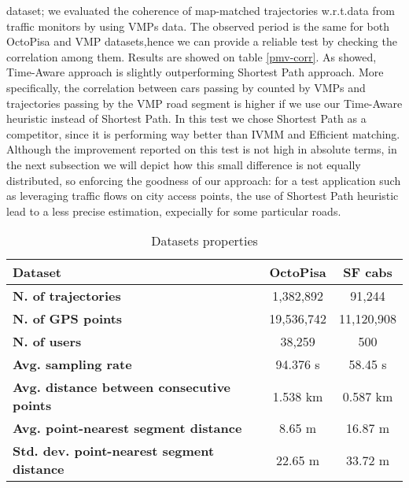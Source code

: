 \documentclass[5p]{elsarticle}
\begin{document}
dataset; we evaluated the coherence of map-matched trajectories w.r.t.data from traffic monitors by using VMPs data. The observed period is the same 
for both OctoPisa and VMP datasets,hence we can provide a reliable
test by checking the correlation among them. Results are showed on table \ref{pmv-corr}.
As showed, Time-Aware approach is slightly outperforming Shortest Path approach. More specifically, the correlation between cars passing by counted by VMPs and
trajectories passing by the VMP road segment is higher if we use our Time-Aware heuristic instead of Shortest Path. In this test we chose Shortest Path as a competitor, 
since it is performing way better than IVMM and Efficient
matching. Although the improvement reported on this test is not high in absolute terms, in the next subsection we will depict how this small difference
is not equally distributed, so enforcing the goodness of our approach: for a test application such as leveraging traffic flows on city access points, the use of Shortest Path 
heuristic lead to a less precise estimation, expecially
for some particular roads.\\




\begin{table}[htpb]
\begin{tabular}{|p{4cm}|c|c|}
\hline
\textbf{Dataset }& OctoPisa & SF cabs \\ \hline
\textbf{N. of trajectories}                                & 1,382,892  & 91,244\\ \hline
\textbf{N. of GPS points}                                   & 19,536,742 & 11,120,908\\ \hline
\textbf{N. of users}                                   & 38,259 & 500 \\ \hline
\textbf{Avg. sampling rate}                             & 94.376 s  & 58.45 s\\ \hline
\textbf{Avg. distance between consecutive points}       & 1.538 km & 0.587 km \\ \hline
\textbf{Avg. point-nearest segment distance}       & 8.65 m  & 16.87 m \\ \hline
\textbf{Std. dev. point-nearest segment \newline distance} & 22.65 m  & 33.72 m\\ \hline
\end{tabular}
\caption{Datasets properties}
\label{dataset}
\end{table}
\end{document}
